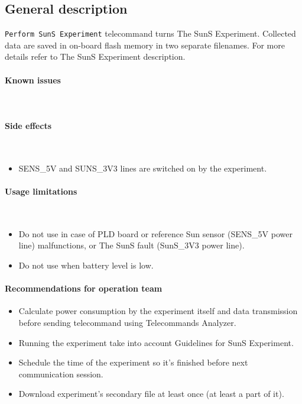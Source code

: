

\subsection{General description}
\texttt{Perform SunS Experiment} telecommand turns The SunS Experiment. Collected data are saved in on-board flash memory in two separate filenames. For more details refer to The SunS Experiment description.

\paragraph{Known issues} \mbox{} \\
\None

\paragraph{Side effects} \mbox{} \\
\begin{itemize}
    \item SENS_5V and SUNS_3V3 lines are switched on by the experiment.
\end{itemize}


\paragraph{Usage limitations} \mbox{} \\
\begin{itemize}
    \item Do not use in case of PLD board or reference Sun sensor (SENS_5V power line) malfunctions, or The SunS fault (SunS_3V3 power line).
    \item Do not use when battery level is low.
\end{itemize}

\paragraph{Recommendations for operation team}
\begin{itemize}
    \item Calculate power consumption by the experiment itself and data transmission before sending telecommand using Telecommands Analyzer.
    \item Running the experiment take into account Guidelines for SunS Experiment.
    \item Schedule the time of the experiment so it's finished before next communication session.
    \item Download experiment's secondary file at least once (at least a part of it).
\end{itemize}

